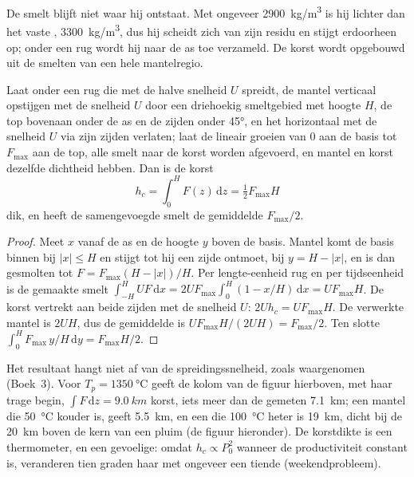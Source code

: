 De smelt blijft niet waar hij ontstaat. Met ongeveer \qty{2900}{kg/m^3} is hij
lichter dan het vaste , \qty{3300}{kg/m^3}, dus hij scheidt zich van zijn
residu en stijgt erdoorheen op; onder een rug wordt hij naar de as toe verzameld.
De korst wordt opgebouwd uit de smelten van een hele mantelregio.

\begin{proposition}\label{prop:b2:mantle-melting:triangle}
Laat onder een rug die met de halve snelheid $U$ spreidt, de mantel verticaal opstijgen met
de snelheid $U$ door een driehoekig smeltgebied met hoogte $H$, de top bovenaan
onder de as en de zijden onder \ang{45}, en het horizontaal met de snelheid $U$
via zijn zijden verlaten; laat de  lineair groeien van $0$ aan de basis tot
$F_{\max}$ aan de top, alle smelt naar de korst worden afgevoerd, en mantel en
korst dezelfde dichtheid hebben. Dan is de korst
\[
  h_c = \int_0^H F(z)\,\mathrm dz = \tfrac12 F_{\max}H
\]
dik, en heeft de samengevoegde smelt de gemiddelde  $F_{\max}/2$.
\end{proposition}

\begin{proof}
Meet $x$ vanaf de as en de hoogte $y$ boven de basis. Mantel komt de basis binnen
bij $|x| \le H$ en stijgt tot hij een zijde ontmoet, bij $y = H - |x|$, en is dan gesmolten tot
$F = F_{\max}(H - |x|)/H$. Per lengte-eenheid rug en per tijdseenheid is de gemaakte smelt
$\int_{-H}^{H} U F\,\mathrm dx = 2UF_{\max}\int_0^H (1 - x/H)\,\mathrm dx =
UF_{\max}H$. De korst vertrekt aan beide zijden met de snelheid $U$: $2Uh_c = UF_{\max}H$.
De verwerkte mantel is $2UH$, dus de gemiddelde  is $UF_{\max}H/(2UH) =
F_{\max}/2$. Ten slotte $\int_0^H F_{\max}\,y/H\,\mathrm dy = F_{\max}H/2$.
\end{proof}

Het resultaat hangt niet af van de spreidingssnelheid, zoals waargenomen
(Boek~3). Voor $T_p = \qty{1350}{\celsius}$ geeft de kolom van de figuur hierboven, met haar
trage begin, $\int F\,\mathrm dz = \qty{9.0}{km}$ korst, iets meer
dan de gemeten \qty{7.1}{km}; een mantel die \qty{50}{\celsius} kouder is, geeft
\qty{5.5}{km}, en een die \qty{100}{\celsius} heter is \qty{19}{km}, dicht bij de
\qty{20}{km} boven de kern van een pluim (de figuur hieronder). De korstdikte is een
thermometer, en een gevoelige: omdat $h_c \propto P_0^2$ wanneer de productiviteit
constant is, veranderen tien graden haar met ongeveer een tiende (weekendprobleem).

